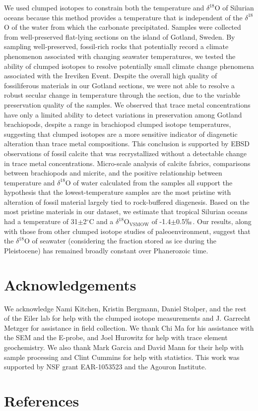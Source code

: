 \documentclass[preprint, authoryear]{elsarticle}
\begin{document}
We used clumped isotopes to constrain both the temperature and $\delta^{18}$O of Silurian oceans because this method provides a temperature that is independent of the $\delta^{18}$O of the water from which the carbonate precipitated. Samples were collected from well-preserved flat-lying sections on the island of Gotland, Sweden. By sampling well-preserved, fossil-rich rocks that potentially record a climate phenomenon associated with changing seawater temperatures, we tested the ability of clumped isotopes to resolve potentially small climate change phenomena associated with the Ireviken Event. Despite the overall high quality of fossiliferous materials in our Gotland sections, we were not able to resolve a robust secular change in temperature through the section, due to the variable preservation quality of the samples. We observed that trace metal concentrations have only a limited ability to detect variations in preservation among Gotland brachiopods, despite a range in brachiopod clumped isotope temperatures, suggesting that clumped isotopes are a more sensitive indicator of diagenetic alteration than trace metal compositions. This conclusion is supported by EBSD observations of fossil calcite that was recrystallized without a detectable change in trace metal concentrations. Micro-scale analysis of calcite fabrics, comparisons between brachiopods and micrite, and the positive relationship between temperature and $\delta^{18}$O of water calculated from the samples all support the hypothesis that the lowest-temperature samples are the most pristine with alteration of fossil material largely tied to rock-buffered diagenesis. Based on the most pristine materials in our dataset, we estimate that tropical Silurian oceans had a temperature of 31$\pm$2$^{\circ}$C and a $\delta^{18}$O$_{\text{VSMOW}}$ of -1.4$\pm$0.5$\permil$. Our results, along with those from other clumped isotope studies of paleoenvironment, suggest that the $\delta^{18}$O of seawater (considering the fraction stored as ice during the Pleistocene) has remained broadly constant over Phanerozoic time. 

\section*{Acknowledgements}

We acknowledge Nami Kitchen, Kristin Bergmann, Daniel Stolper, and the rest of the Eiler lab for help with the clumped isotope measurements and J. Garrecht Metzger for assistance in field collection. We thank Chi Ma for his assistance with the SEM and the E-probe, and Joel Hurowitz for help with trace element geochemistry. We also thank Mark Garcia and David Mann for their help with sample processing and Clint Cummins for help with statistics. This work was supported by NSF grant EAR-1053523 and the Agouron Institute.

\section*{References}


\end{document}
